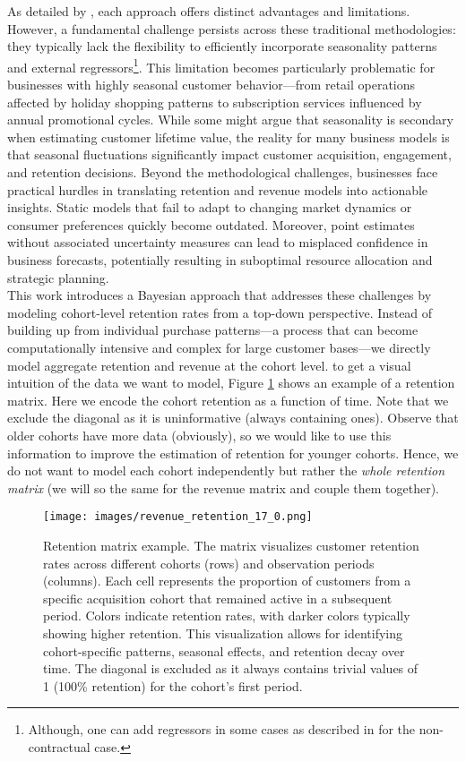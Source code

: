 \documentclass[11pt]{amsart}
\theoremstyle{definition}
\begin{document}
As detailed by \cite{FaderHardieNote2017}, each approach offers distinct advantages and limitations. However, a fundamental
challenge persists across these traditional methodologies: they typically lack the flexibility to efficiently incorporate
seasonality patterns and external regressors\footnote{Although, one can add regressors in some cases as described in
    \cite{FaderHardieNote2007} for the non-contractual case.}. This limitation becomes particularly problematic for businesses
with highly seasonal customer behavior—from retail operations affected by holiday shopping patterns to subscription services
influenced by annual promotional cycles. While some might argue that seasonality is secondary when estimating customer
lifetime value, the reality for many business models is that seasonal fluctuations significantly impact customer acquisition,
engagement, and retention decisions. Beyond the methodological challenges, businesses face practical hurdles in translating
retention and revenue models into actionable insights. Static models that fail to adapt to changing market dynamics or
consumer preferences quickly become outdated. Moreover, point estimates without associated uncertainty measures can lead to
misplaced confidence in business forecasts, potentially resulting in suboptimal resource allocation and strategic planning. \\

This work introduces a Bayesian approach that addresses these challenges by modeling cohort-level retention rates from a
top-down perspective. Instead of building up from individual purchase patterns—a process that can become computationally
intensive and complex for large customer bases—we directly model aggregate retention and revenue at the cohort level.
to get a visual intuition of the data we want to model, Figure \ref{fig:retention_matrix} shows an example of a retention
matrix. Here we encode the cohort retention as a function of time. Note that we exclude the diagonal as it is
uninformative (always containing ones). Observe that older cohorts have more data (obviously), so we would like to use
this information to improve the estimation of retention for younger cohorts. Hence, we do not want to model each cohort
independently but rather the {\em whole retention matrix} (we will so the same for the revenue matrix and couple them
together). \\

\begin{figure}
    \centering
    \texttt{[image: images/revenue\_retention\_17\_0.png]}
    \caption{Retention matrix example. The matrix visualizes customer retention rates across different cohorts (rows) and
        observation periods (columns). Each cell represents the proportion of customers from a specific acquisition
        cohort that remained active in a subsequent period. Colors indicate retention rates, with darker colors typically
        showing higher retention. This visualization allows for identifying cohort-specific patterns, seasonal effects,
        and retention decay over time. The diagonal is excluded as it always contains trivial values of 1 (100\%
        retention) for the cohort's first period.}
    \label{fig:retention_matrix}
\end{figure}
\end{document}
